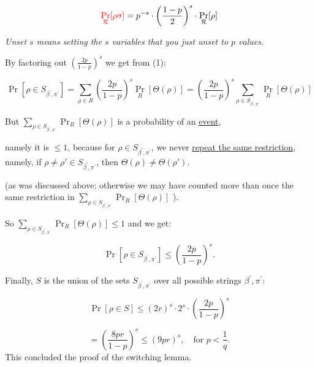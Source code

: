 \[
\textcolor{red}{\Pr_{\mathcal{R}} [\rho\sigma]} = p^{-s} \cdot \left( \frac{1-p}{2} \right)^s \cdot \Pr_{\mathcal{R}} [\rho]
\]

\textit{Unset \( s \) means setting the \( s \) variables that you just unset to \( p \) values.}

By factoring out \( \left( \frac{2p}{1 - p} \right)^s \) we get from (1):

\[
\Pr \left[ \rho \in S_{\beta^{'},\pi^{'}} \right] = \sum_{\rho \in R} \left( \frac{2p}{1 - p} \right)^s \Pr_R [\Theta(\rho)]
= \left( \frac{2p}{1 - p} \right)^s \sum_{\rho \in S_{\beta^{'},\pi^{'}}} \Pr_R [\Theta(\rho)]
\]

But \( \sum_{\rho \in S_{\beta^{'},\pi^{'}}} \Pr_R [\Theta(\rho)] \) is a probability of an \underline{event}, 

namely it is \( \leq 1 \), because for \( \rho \in S_{\beta^{'},\pi^{'}} \), we never 
\underline{repeat the same restriction}, namely, if \( \rho \neq \rho' \in S_{\beta^{'},\pi^{'}} \), then \( \Theta(\rho) \neq \Theta(\rho') \).

(as was discussed above; otherwise we may have counted more than once the same restriction in \( \sum_{\rho \in S_{\beta^{'},\pi^{'}}} \Pr_R [\Theta(\rho)] \) ).

So \( \sum_{\rho \in S_{\beta^{'},\pi^{'}}} \Pr_R [\Theta(\rho)] \leq 1 \) and we get:

\[
\Pr \left[ \rho \in S_{\beta^{'},\pi^{'}} \right] \leq \left( \frac{2p}{1 - p} \right)^s.
\]

Finally, \( S \) is the union of the sets \( S_{\beta^{'},\pi^{'}} \) over all possible strings \( \beta^{'},\pi^{'} \):

\[
\Pr \left[ \rho \in S \right] \leq (2r)^s \cdot 2^s \cdot \left( \frac{2p}{1 - p} \right)^s
\]

\[
= \left( \frac{8 p r}{1 - p} \right)^s \leq (9 p r)^s, \quad \text{for } p < \frac{1}{q}.
\]
This concluded the proof of the switching lemma. 


